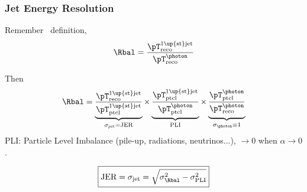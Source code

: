 \begin{frame}
\frametitle{Jet Energy Resolution}
\manip Remember \Rbal\ definition,
\begin{equation*}
\Rbal = \frac{{\pT}^\text{1\up{st}jet}_\text{reco}}{\pT^\photon_\text{reco}}
\end{equation*}

\pause

Then
\begin{equation*}
\Rbal
=
\underbrace{\frac{{\pT}^\text{1\up{st}jet}_\text{reco}}{{\pT}^\text{1\up{st}jet}_\text{ptcl}}}_{\sigma_\text{jet}=\text{JER}}
\times
\underbrace{\frac{{\pT}^\text{1\up{st}jet}_\text{ptcl}}{\pT^\photon_\text{ptcl}}
\vphantom{\frac{{\pT}^\text{1\up{st}jet}_\text{reco}}{{\pT}^\text{1\up{st}jet}_\text{ptcl}}}}_{\text{PLI}}
\times
\underbrace{\frac{\pT^\photon_\text{ptcl}}{\pT^\photon_\text{reco}}
\vphantom{\frac{{\pT}^\text{1\up{st}jet}_\text{reco}}{{\pT}^\text{1\up{st}jet}_\text{ptcl}}}}_{\sigma_\photon\equiv1}
\end{equation*}
\manip PLI: Particle Level Imbalance (pile-up, radiations, neutrinos...), $\to0$ when $\alpha\to0$.

\pause
\begin{equation*}
\boxed{\text{JER} = \sigma_\text{jet} =  \sqrt{\sigma_\Rbal^2 - \sigma_\text{PLI}^2}}
\end{equation*}
\end{frame}

